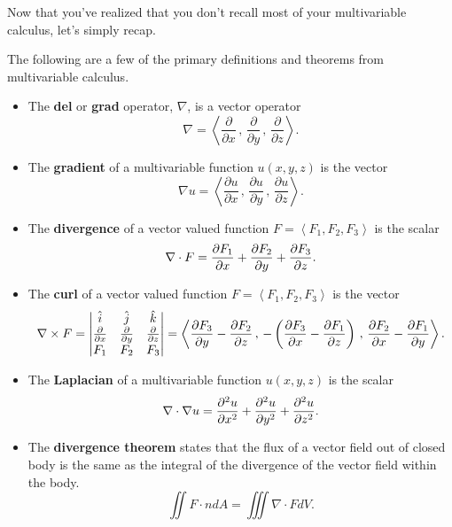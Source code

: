 Now that you've realized that you don't recall most of your multivariable calculus, let's
simply recap.
\begin{definition}
    The following are a few of the primary definitions and theorems from multivariable
    calculus.
    \begin{itemize}
        \item The {\bf del} or {\bf grad} operator, $\nabla$, is a vector operator 
            \[ \nabla = \left< \frac{\partial}{\partial x} \, , \,
                \frac{\partial}{\partial y} \, , \, \frac{\partial}{\partial z} \right>.
            \]
        \item The {\bf gradient} of a multivariable function $u(x,y,z)$ is the vector
            \[ \nabla u = \left< \frac{\partial u}{\partial x} \, , \,
                \frac{\partial u}{\partial y} \, , \, \frac{\partial u}{\partial z}
            \right>. \]
        \item The {\bf divergence} of a vector valued function $F = \left< F_1, F_2,
            F_3\right>$ is the scalar
            \[ \nabla \cdot F = \frac{\partial{F_1}}{\partial{x}} + \frac{\partial{F_2}}{\partial{y}} + \frac{\partial{F_3}}{\partial{z}}. \]
        \item The {\bf curl} of a vector valued function $F = \left< F_1, F_2,
            F_3\right>$ is the vector
            \[ \nabla \times F = \begin{vmatrix} \hat{i} & \hat{j} & \hat{k} \\ \frac{\partial{ }}{\partial{x}}
                & \frac{\partial{ }}{\partial{y}} & \frac{\partial{ }}{\partial{z}} \\ F_1 & F_2 & F_3 \end{vmatrix} = \left<
        \frac{\partial{F_3}}{\partial{y}} - \frac{\partial{F_2}}{\partial{z}} \, , \, -\left( \frac{\partial{F_3}}{\partial{x}} - \frac{\partial{F_1}}{\partial{z}} \right) \, ,
    \, \frac{\partial{F_2}}{\partial{x}} - \frac{\partial{F_1}}{\partial{y}} \right>.\] 
        \item The {\bf Laplacian} of a multivariable function $u(x,y,z)$ is the scalar
            \[ \nabla \cdot \nabla u = \frac{\partial^2{u}}{\partial{x}^2} + \frac{\partial^2{u}}{\partial{y}^2} + \frac{\partial^2{u}}{\partial{z}^2}. \]
        \item The {\bf divergence theorem} states that the flux of a vector field out of closed body is the
            same as the integral of the divergence of the vector field within the body.
            \[ \iint F \cdot n dA = \iiint \nabla \cdot F dV. \]
    \end{itemize}
\end{definition}

